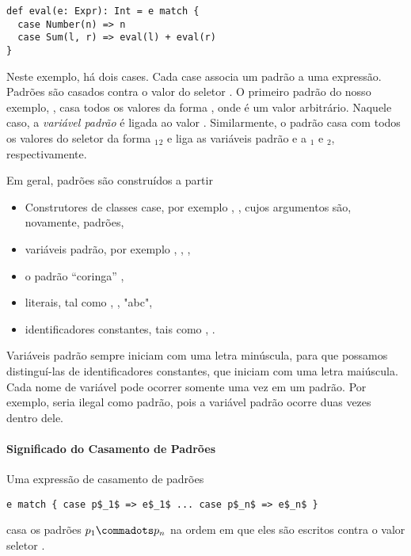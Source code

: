\begin{lstlisting}
def eval(e: Expr): Int = e match {
  case Number(n) => n 
  case Sum(l, r) => eval(l) + eval(r) 
}
\end{lstlisting}

Neste exemplo, h\'{a} dois cases. Cada case associa um padr\~{a}o a uma express\~{a}o. 
Padr\~{o}es s\~{a}o casados contra o valor do seletor . O primeiro padr\~{a}o do
nosso exemplo, , casa todos os valores da forma ,
onde  \'{e} um valor arbitr\'{a}rio. Naquele caso, a {\em vari\'{a}vel padr\~{a}o} 
\'{e} ligada ao valor . Similarmente, o padr\~{a}o  casa com todos 
os valores do seletor da forma $_1$$_2$\code{)} e liga as 
vari\'{a}veis padr\~{a}o  e  a $_1$ e $_2$, respectivamente. 

Em geral, padr\~{o}es s\~{a}o constru\'{i}dos a partir

\begin{itemize}
\item Construtores de classes case, por exemplo , , cujos
argumentos s\~{a}o, novamente, padr\~{o}es, 
\item vari\'{a}veis padr\~{a}o, por exemplo , , , 
\item o padr\~{a}o ``coringa'' \code{_},
\item literais, tal como , ,  "abc", 
\item identificadores constantes, tais como , .  
\end{itemize}

Vari\'{a}veis padr\~{a}o sempre iniciam com uma letra min\'{u}scula, para que possamos
distingu\'{i}-las de identificadores constantes, que iniciam com uma letra 
mai\'{u}scula. Cada nome de vari\'{a}vel pode ocorrer somente uma vez em um padr\~{a}o. 
Por exemplo,  seria ilegal como padr\~{a}o, pois a vari\'{a}vel padr\~{a}o 
 ocorre duas vezes dentro dele.  

\paragraph{Significado do Casamento de Padr\~{o}es}
Uma express\~{a}o de casamento de padr\~{o}es

\begin{lstlisting}
e match { case p$_1$ => e$_1$ ... case p$_n$ => e$_n$ }
\end{lstlisting}
casa os padr\~{o}es $p_1 \commadots p_n$ na ordem em que eles s\~{a}o 
escritos contra o valor seletor .

